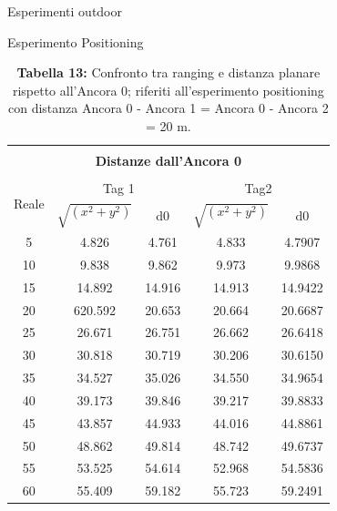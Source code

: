 \documentclass[12pt]{report}
\begin{document}
\begin{section}{Esperimenti outdoor}
\begin{subsection}{Esperimento Positioning}
\begin{table}[H]
				\centering
				\begin{tabular}{|c||c|c||c|c|}
					\hline
					\multicolumn{5}{|c|}{}\\
					\multicolumn{5}{|c|}{\textbf{\Large Distanze dall'Ancora 0}}\\
					\multicolumn{5}{|c|}{}\\
					\hline
					\multirow{2}{*}{Reale}&\multicolumn{2}{|c||}{Tag 1}&	\multicolumn{2}{|c|}{Tag2}\\
					\cline{2-5}
					&$\sqrt{(x^2+y^2)}$& d0& 		$\sqrt{(x^2+y^2)}$& d0\\
					\hline
					5&4.826&    				4.761&      4.833&    				  4.7907\\
					\hline
   					10&9.838&   				9.862&      9.973 &   				  9.9868\\
					\hline
   					15&14.892&  				14.916&    14.913&   			 14.9422\\
					\hline
   					20&620.592& 				20.653&    20.664&  				 20.6687\\
					\hline
   					25&26.671&   				26.751&    26.662&   			 26.6418\\
					\hline
   					30&30.818&   				30.719&    30.206&   			 30.6150\\
					\hline
   					35&34.527&   				35.026&    34.550&   			 34.9654\\
					\hline
   					40&39.173&   				39.846&    39.217&   			 39.8833\\
					\hline
   					45&43.857&   				44.933&    44.016&   			 44.8861\\
					\hline
   					50&48.862&   				49.814&    48.742&   			 49.6737\\
					\hline  					
					55&53.525&   				54.614&    52.968&  				 54.5836\\
					\hline
   					60&55.409&   				59.182&    55.723&   			 59.2491\\
					\hline
				\end{tabular}
				\caption{\textbf{Tabella 13:} Confronto tra ranging e distanza planare rispetto all'Ancora 0; riferiti all'esperimento positioning con distanza Ancora 0 - Ancora 1 = Ancora 0 - Ancora 2 = 20 m. \label{EspOut20}}
			\end{table}


\end{subsection}
\end{section}
\end{document}
